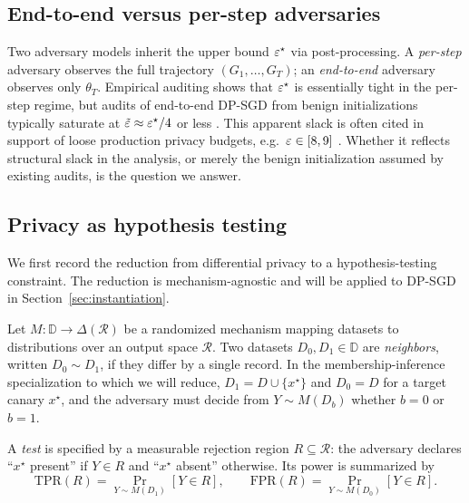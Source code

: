 \subsection{End-to-end versus per-step adversaries}
\label{sec:endtoend}

Two adversary models inherit the upper bound $\varepsilon^\star$ via post-processing. A \emph{per-step} adversary observes the full trajectory $(G_1, \ldots, G_T)$; an \emph{end-to-end} adversary observes only $\theta_T$. Empirical auditing shows that $\varepsilon^\star$ is essentially tight in the per-step regime, but audits of end-to-end DP-SGD from benign initializations typically saturate at $\tilde{\varepsilon} \approx \varepsilon^\star / 4$ or less \citep{nasr2021adversary, jagielski2020auditing}. This apparent slack is often cited in support of loose production privacy budgets, e.g.\ $\varepsilon \in [8,9]$ \citep{ramaswamy2020training}. Whether it reflects structural slack in the analysis, or merely the benign initialization assumed by existing audits, is the question we answer.

\subsection{Privacy as hypothesis testing}
\label{sec:ht-dp}

We first record the reduction from differential privacy to a hypothesis-testing constraint. The reduction is mechanism-agnostic and will be applied to DP-SGD in Section~\ref{sec:instantiation}.


Let $M : \mathbb{D} \to \Delta(\mathcal{R})$ be a randomized mechanism mapping datasets to distributions over an output space $\mathcal{R}$. Two datasets $D_0, D_1 \in \mathbb{D}$ are \emph{neighbors}, written $D_0 \sim D_1$, if they differ by a single record. In the membership-inference specialization to which we will reduce, $D_1 = D \cup \{x^\star\}$ and $D_0 = D$ for a target canary $x^\star$, and the adversary must decide from $Y \sim M(D_b)$ whether $b = 0$ or $b = 1$.

\begin{definition}
\label{def:det-test}
A \emph{test} is specified by a measurable rejection region $R \subseteq \mathcal{R}$: the adversary declares ``$x^\star$ present'' if $Y \in R$ and ``$x^\star$ absent'' otherwise. Its power is summarized by
\[
  \mathrm{TPR}(R) = \Pr_{Y \sim M(D_1)}[Y \in R],
  \qquad
  \mathrm{FPR}(R) = \Pr_{Y \sim M(D_0)}[Y \in R].
\]
\end{definition}

